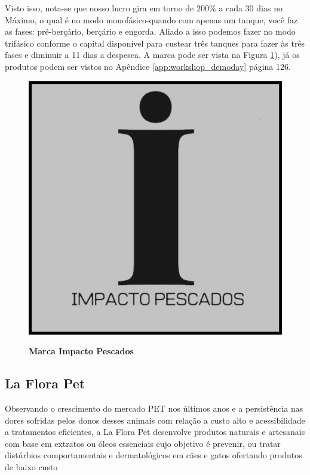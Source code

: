 Visto isso, nota-se que nosso lucro gira em torno de 200\% a cada 30 dias no Máximo, o qual é no modo monofásico-quando com apenas um tanque, você faz as fases: pré-berçário, berçário e engorda. Aliado a isso podemos fazer no modo trifásico conforme o capital disponível para custear três tanques para fazer às três fases e diminuir a 11 dias a despesca. A marca pode ser vista na Figura \ref{figura_23}), já os produtos podem ser vistos no Apêndice \ref{app:workshop_demoday} página 126.

\begin{figure}[H]
\centering
\caption{\textbf{Marca Impacto Pescados}}
\includegraphics[scale=0.3]{Imagens/imacto_pescados.jpg}
\label{figura_23}
\end{figure}


\subsection{La Flora Pet}

Observando o crescimento do mercado PET nos últimos anos e a persistência nas dores sofridas pelos donos desses animais com relação a custo alto e acessibilidade a tratamentos eficientes, a La Flora Pet desenvolve produtos naturais e artesanais com base em extratos ou óleos essenciais cujo objetivo é prevenir, ou tratar distúrbios comportamentais e dermatológicos em cães e gatos ofertando produtos de baixo custo

